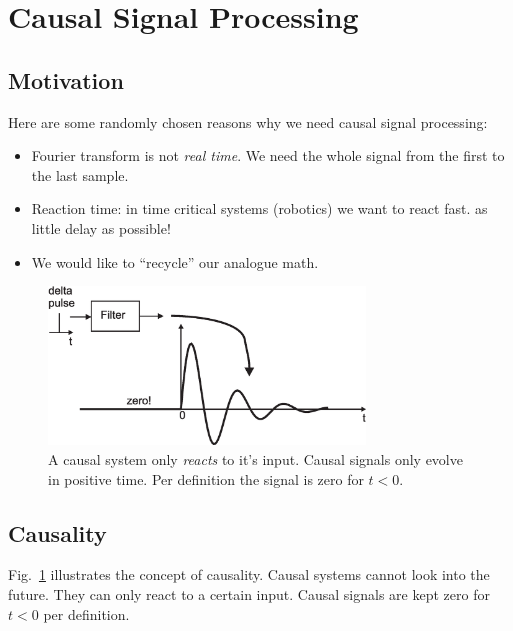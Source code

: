 \documentclass[12pt,a4paper]{article}
\begin{document}
\section{Causal Signal Processing}

\subsection{Motivation}

Here are some randomly chosen reasons why we need causal
signal processing:
\begin{itemize}
\item Fourier transform is not \textsl{real time}.  
We need the whole signal from the first to the last sample.
\item Reaction time: in time critical systems (robotics) we
want to react fast.
as little delay as possible!
\item We would like to ``recycle'' our analogue math.
\end{itemize}


\begin{figure}[!hbt]
\begin{center}
\mbox{\includegraphics[width=0.75\textwidth]{causality}}
\end{center}
\caption{A causal system only \textsl{reacts} to it's input.
Causal signals only evolve in positive time. Per definition the
signal is zero for $t<0$.
\label{causality}}
\end{figure}


\subsection{Causality}
Fig.~\ref{causality} illustrates the concept of causality.
Causal systems cannot look into the future. They can only react
to a certain input. Causal signals are kept zero for $t<0$
per definition.
\end{document}
